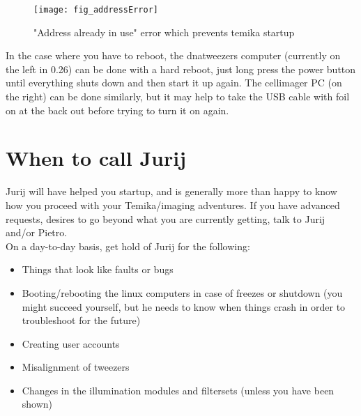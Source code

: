 \documentclass{report}
\begin{document}
\begin{figure}[h]
		\texttt{[image: fig\_addressError]}
		\caption{"Address already in use" error which prevents temika startup}
\end{figure}

In the case where you have to reboot, the dnatweezers computer (currently on the left in 0.26) can be done with a hard reboot, just long press the power button until everything shuts down and then start it up again. The cellimager PC (on the right) can be done similarly, but it may help to take the USB cable with foil on at the back out before trying to turn it on again. 

\section{When to call Jurij}
Jurij will have helped you startup, and is generally more than happy to know how you proceed with your Temika/imaging adventures.   If you have advanced requests, desires to go beyond what you are currently getting,  talk to Jurij and/or Pietro.   \\

On a day-to-day basis, get hold of Jurij for the following:
\begin{itemize}
  \item Things that look like faults or bugs
  \item Booting/rebooting the linux computers in case of freezes or shutdown  (you might succeed yourself, but he needs to know when things crash in order to troubleshoot for the future)
  \item  Creating user accounts
  \item   Misalignment of tweezers
  \item  Changes in the illumination modules and filtersets (unless you have been shown)
\end{itemize}
\end{document}

